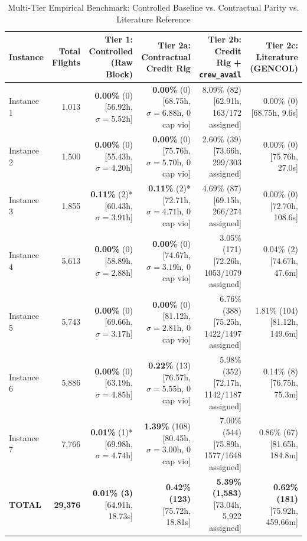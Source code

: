 \documentclass[journal]{IEEEtran}
\begin{document}
\begin{table}[t]
\caption{Multi-Tier Empirical Benchmark: Controlled Baseline vs. Contractual Parity vs. Literature Reference}
\label{tab:multitier_parity}
\centering
\begin{tabular}{lrrrrr}
\toprule
Instance & Total Flights & Tier 1: Controlled (Raw Block) & Tier 2a: Contractual Credit Rig & Tier 2b: Credit Rig + \texttt{crew\_avail} & Tier 2c: Literature (GENCOL) \\
\midrule
Instance 1 & 1,013 & \textbf{0.00\%} (0) [56.92h, $\sigma=5.52$h] & \textbf{0.00\%} (0) [68.75h, $\sigma=6.88$h, 0 cap vio] & 8.09\% (82) [62.91h, 163/172 assigned] & 0.00\% (0) [68.75h, 9.6s] \\
Instance 2 & 1,500 & \textbf{0.00\%} (0) [55.43h, $\sigma=4.20$h] & \textbf{0.00\%} (0) [75.76h, $\sigma=5.70$h, 0 cap vio] & 2.60\% (39) [73.66h, 299/303 assigned] & 0.00\% (0) [75.76h, 27.0s] \\
Instance 3 & 1,855 & \textbf{0.11\%} (2)* [60.43h, $\sigma=3.91$h] & \textbf{0.11\%} (2)* [72.71h, $\sigma=4.71$h, 0 cap vio] & 4.69\% (87) [69.15h, 266/274 assigned] & 0.00\% (0) [72.70h, 108.6s] \\
Instance 4 & 5,613 & \textbf{0.00\%} (0) [58.89h, $\sigma=2.88$h] & \textbf{0.00\%} (0) [74.67h, $\sigma=3.19$h, 0 cap vio] & 3.05\% (171) [72.26h, 1053/1079 assigned] & 0.04\% (2) [74.67h, 47.6m] \\
Instance 5 & 5,743 & \textbf{0.00\%} (0) [69.66h, $\sigma=3.17$h] & \textbf{0.00\%} (0) [81.12h, $\sigma=2.81$h, 0 cap vio] & 6.76\% (388) [75.25h, 1422/1497 assigned] & 1.81\% (104) [81.12h, 149.6m] \\
Instance 6 & 5,886 & \textbf{0.00\%} (0) [63.19h, $\sigma=4.85$h] & \textbf{0.22\%} (13) [76.57h, $\sigma=5.55$h, 0 cap vio] & 5.98\% (352) [72.17h, 1142/1187 assigned] & 0.14\% (8) [76.75h, 75.3m] \\
Instance 7 & 7,766 & \textbf{0.01\%} (1)* [69.98h, $\sigma=4.74$h] & \textbf{1.39\%} (108) [80.45h, $\sigma=3.00$h, 0 cap vio] & 7.00\% (544) [75.89h, 1577/1648 assigned] & 0.86\% (67) [81.65h, 184.8m] \\
\midrule
\textbf{TOTAL} & \textbf{29,376} & \textbf{0.01\% (3)} [64.91h, 18.73s] & \textbf{0.42\% (123)} [75.72h, 18.81s] & \textbf{5.39\% (1,583)} [73.04h, 5,922 assigned] & \textbf{0.62\% (181)} [75.92h, 459.66m] \\
\bottomrule
\end{tabular}
\end{table}
\end{document}
